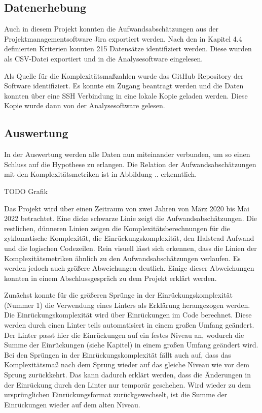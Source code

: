 \subsection{Datenerhebung}\label{Alstonii-Datenerhebung}

Auch in diesem Projekt konnten die Aufwandsabschätzungen aus der
Projektmanagementsoftware Jira exportiert werden. Nach den in Kapitel
4.4 definierten Kriterien konnten 215 Datensätze identifiziert werden.
Diese wurden als CSV-Datei exportiert und in die Analysesoftware
eingelesen.

Als Quelle für die Komplexitätsmaßzahlen wurde das GitHub Repository der
Software identifiziert. Es konnte ein Zugang beantragt werden und die
Daten konnten über eine SSH Verbindung in eine lokale Kopie geladen
werden. Diese Kopie wurde dann von der Analysesoftware gelesen.

\subsection{Auswertung}\label{Alstonii-Auswertung}

In der Auswertung werden alle Daten nun miteinander verbunden, um so
einen Schluss auf die Hypothese zu erlangen. Die Relation der
Aufwandsabschätzungen mit den Komplexitätsmetriken ist in Abbildung ..
erkenntlich.

TODO Grafik

Das Projekt wird über einen Zeitraum von zwei Jahren von März 2020 bis
Mai 2022 betrachtet. Eine dicke schwarze Linie zeigt die
Aufwandsabschätzungen. Die restlichen, dünneren Linien zeigen die
Komplexitätsberechnungen für die zyklomatische Komplexität, die
Einrückungskomplexität, den Halstead Aufwand und die logischen
Codezeilen. Rein visuell lässt sich erkennen, dass die Linien der
Komplexitätsmetriken ähnlich zu den Aufwandsabschätzungen verlaufen. Es
werden jedoch auch größere Abweichungen deutlich. Einige dieser
Abweichungen konnten in einem Abschlussgespräch zu dem Projekt erklärt
werden.

Zunächst konnte für die größeren Sprünge in der Einrückungskomplexität
(Nummer 1) die Verwendung eines Linters als Erklärung herangezogen
werden. Die Einrückungskomplexität wird über Einrückungen im Code
berechnet. Diese werden durch einen Linter teils automatisiert in einem
großen Umfang geändert. Der Linter passt hier die Einrückungen auf ein
festes Niveau an, wodurch die Summe der Einrückungen (siehe Kapitel) in
einem großen Umfang geändert wird. Bei den Sprüngen in der
Einrückungskomplexität fällt auch auf, dass das Komplexitätsmaß nach dem
Sprung wieder auf das gleiche Niveau wie vor dem Sprung zurückkehrt. Das
kann dadurch erklärt werden, dass die Änderungen in der Einrückung durch
den Linter nur temporär geschehen. Wird wieder zu dem ursprünglichen
Einrückungsformat zurückgewechselt, ist die Summe der Einrückungen
wieder auf dem alten Niveau.

